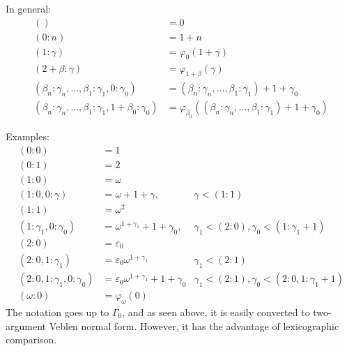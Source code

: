 \documentclass{article}
\newcommand{\w}{\omega}
\newcommand{\e}{\varepsilon}
\begin{document}


In general:
\begin{align*}
  () &= 0 \\
  (0: n) &= 1+n \\
  (1: \gamma) &= \varphi_0(1+\gamma) \\
  (2+\beta: \gamma) &= \varphi_{1+\beta}(\gamma) \\
  (\beta_n: \gamma_n, \ldots, \beta_1: \gamma_1, 0: \gamma_0)
  &= (\beta_n: \gamma_n, \ldots, \beta_1: \gamma_1)+1+\gamma_0 \\
  (\beta_n: \gamma_n, \ldots, \beta_1: \gamma_1, 1+\beta_0: \gamma_0)
  &= \varphi_{\beta_0}((\beta_n: \gamma_n, \ldots, \beta_1: \gamma_1)+1+\gamma_0)
\end{align*}

Examples:
\begin{align*}
  (0: 0) &= 1 \\
  (0: 1) &= 2 \\
  (1: 0) &= \w \\
  (1: 0, 0:\gamma) &= \w+1+\gamma, & \gamma < (1: 1) \\
  (1: 1) &= \w^2 \\
  (1: \gamma_1, 0:\gamma_0) &= \w^{1+\gamma_1}+1+\gamma_0,
  & \gamma_1 < (2: 0), \gamma_0 < (1:\gamma_1+1) \\
  (2: 0) &= \e_0 \\
  (2: 0, 1: \gamma_1) &= \e_0\w^{1+\gamma_1}
  & \gamma_1 < (2: 1) \\
  (2: 0, 1: \gamma_1, 0: \gamma_0) &= \e_0\w^{1+\gamma_1}+1+\gamma_0
  & \gamma_1 < (2: 1), \gamma_0 < (2: 0, 1: \gamma_1+1) \\
  (\w: 0) &= \varphi_\w(0)
\end{align*}
The notation goes up to $\Gamma_0$,
and as seen above, it is easily converted to two-argument Veblen normal form.
However, it has the advantage of lexicographic comparison.
\end{document}
